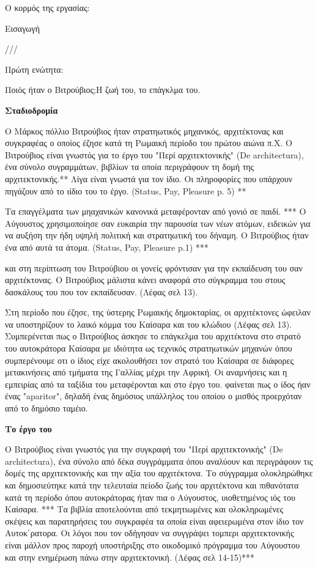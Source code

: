 
Ο κορμός της εργασίας:

Εισαγωγή

///

Πρώτη ενώτητα:

Ποιός ήταν ο Βιτρούβιος;Η ζωή του, το επάγκλμα του.

\textbf{Σταδιοδρομία}

Ο Μάρκος πόλλιο Βιτρούβιος ήταν στρατηωτικός μηχανικός, αρχιτέκτονας και
συγκραφέας ο οποίος έζησε κατά τη Ρωμαική περίοδο του πρώτου αιώνα π.Χ. Ο
Βιτρούβιος είναι γνωστός για το έργο του "Περί αρχιτεκτονικής" (De
architectura), ένα σύνολο συγραμμάτων, βιβλίων τα οποία περιγράφουν τη δομή της
αρχιτεκτονικής.** Λίγα είναι γνωστά για τον ίδιο. Οι πληροφορίες που υπάρχουν
πηγάζουν από το ιίδιο του το έργο. (Status, Pay, Pleasure p. 5) **

Τα επαγγέλματα των μηαχανικών κανονικά μεταφέρονταν από γονιό σε παιδί.  *** 
 Ο
Αύγουστος χρησιμοποίησε σαν ευκαιρία την παρουσία των νέων ατόμων, ειδεικών για
να αυξήση την ήδη υψηλή πολιτική και στρατηωτική του δήναμη. Ο Βιτρούβιος ήταν
ένα από αυτά τα άτομα. (Status, Pay, Pleasure p.1) ***

και στη περίπτωση του Βιτρούβιου οι γονείς φρόντισαν για την εκπαίδευση του σαν
αρχιτέκτονας. Ο Βιτρούβιος μάλιστα κάνει αναφορά στο σύγκραμμα του στους
δασκάλους του που τον εκπαίδευσαν. (Λέφας σελ 13).

Στη περίοδο που έζησε, της ύστερης Ρωμαικής δημοκταρίας, οι αρχιτέκτονες ώφειλαν
να υποστηρίζουν το λαικό κόμμα του Καίσαρα και του κλώδιου (Λέφας σελ 13).
Συμπερένεται πως ο Βιτρούβιος άσκησε το επάγκελμα του αρχιτέκτονα στο στρατό του
αυτοκράτορα Καίσαρα με ιδιότητα ως τεχνικός στρατηωτικών μηχανών όπου
συμπερένουμε οτι ο ίδιος είχε ακολουθήσει τον στρατό του Καίσαρα σε διάφορες
μετακινήσεις από τμήματα της Γαλλίας μέχρι την Αφρική. Οι αναμνήσεις και η
εμπειρίας από τα ταξίδια του μεταφέρονται και στο έργο του. φαίνεται πως ο ίδος
ήαν ένας "aparitor", δηλαδή ένας δημόσιος υπάλληλος του οποίου ο μισθός
προερχόταν από το δημόσιο ταμέιο.

\textbf{Το έργο του}

Ο Βιτρούβιος είναι γνωστός για την συγκραφή του "Περί αρχιτεκτονικής" (De
architectura), ένα σύνολο από δέκα συγγράμματα όπου αναλύουν και περιγράφουν τις
δομές της αρχιτεκτονικής και την αξία του αρχιτέκτονα.
 Το σύγγραμμα
ολοκληρώθηκε και δημοσιεύτηκε κατά την τελευταία πείοδο ζωής του αρχιτέκτονα και
πιθανότατα κατά τη περίοδο όπου αυτοκράτορας ήταν πια ο Αύγουστος, υιοθετημένος
ιός του Καίσαρα. ***
 Τα βιβλία αποτελούνται από τεκμητιωμένες και ολοκληρωμένες
σκέψεις και παρατηρήσεις του συγκραφέα τα οποία είναι αφειερωμένα στον ίδιο τον
Αυτοκ΄ρατορα. Οι λόγοι που τον οδήγησαν να συγγράψει τομπερι αρχιτεκτονικής
είναι μάλλον προς παροχή υποστήριξης στο οικοδομικό πρόγραμμα του Αύγουστου και
στην ενημέρωση πάνω στην αρχιτεκτονική. (Λέφας σελ 14-15)***

